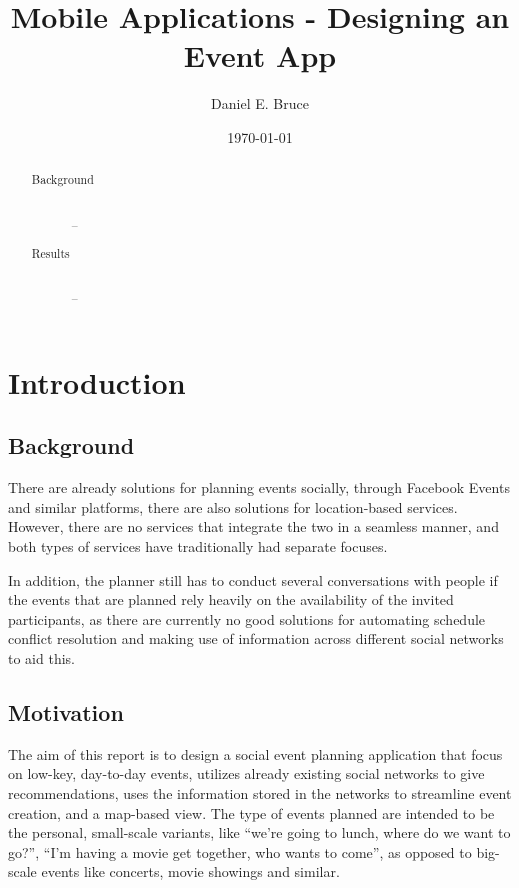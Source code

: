 \documentclass[]{report}
\begin{document}
\title{Mobile Applications - Designing an Event App}
\author{Daniel E. Bruce}
\date{\today}
\maketitle

\begin{abstract}
  \begin{description}
    \item[Background] \hfill \\
      --
    \item[Results] \hfill \\
      --
  \end{description}
\end{abstract}

\tableofcontents

\chapter{Introduction}

\section{Background}

There are already solutions for planning events socially, through Facebook
Events and similar platforms, there are also solutions for location-based
services. However, there are no services that integrate the two in a seamless
manner, and both types of services have traditionally had separate focuses.

In addition, the planner still has to conduct several conversations with people
if the events that are planned rely heavily on the availability of the invited
participants, as there are currently no good solutions for automating schedule
conflict resolution and making use of information across different social
networks to aid this.

\section{Motivation}

The aim of this report is to design a social event planning application
that focus on low-key, day-to-day events, utilizes already existing social
networks to give recommendations, uses the information stored in the networks to
streamline event creation, and a map-based view. The type of events planned are
intended to be the personal, small-scale variants, like ``we're going to lunch,
where do we want to go?'', ``I'm having a movie get together, who wants to
come'', as opposed to big-scale events like concerts, movie showings and
similar.
\end{document}
